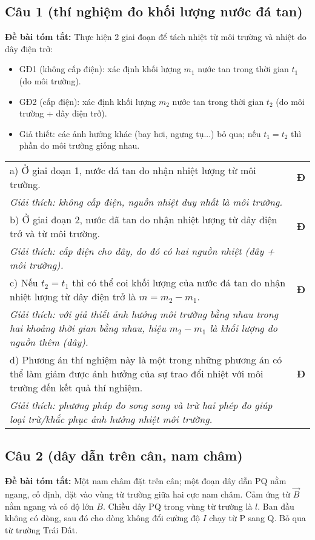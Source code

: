 \documentclass[12pt,a4paper]{article}
\begin{document}
\subsection*{Câu 1 (thí nghiệm đo khối lượng nước đá tan)}
\textbf{Đề bài tóm tắt:} Thực hiện 2 giai đoạn để tách nhiệt từ môi trường và nhiệt do dây điện trở: 
\begin{itemize}
  \item GĐ1 (không cấp điện): xác định khối lượng $m_1$ nước tan trong thời gian $t_1$ (do môi trường). 
  \item GĐ2 (cấp điện): xác định khối lượng $m_2$ nước tan trong thời gian $t_2$ (do môi trường + dây điện trở). 
  \item Giả thiết: các ảnh hưởng khác (bay hơi, ngưng tụ...) bỏ qua; nếu $t_1=t_2$ thì phần do môi trường giống nhau.
\end{itemize}

\begin{tabular}{p{}l}
a) Ở giai đoạn 1, nước đá tan do nhận nhiệt lượng từ môi trường. & \textbf{Đ} \\
\quad\textit{Giải thích: không cấp điện, nguồn nhiệt duy nhất là môi trường.} & \\[4pt]
b) Ở giai đoạn 2, nước đã tan do nhận nhiệt lượng từ dây điện trở và từ môi trường. & \textbf{Đ} \\
\quad\textit{Giải thích: cấp điện cho dây, do đó có hai nguồn nhiệt (dây + môi trường).} & \\[4pt]
c) Nếu $t_2=t_1$ thì có thể coi khối lượng của nước đá tan do nhận nhiệt lượng từ dây điện trở là $m=m_2-m_1$. & \textbf{Đ} \\
\quad\textit{Giải thích: với giả thiết ảnh hưởng môi trường bằng nhau trong hai khoảng thời gian bằng nhau, hiệu $m_2-m_1$ là khối lượng do nguồn thêm (dây).} & \\[4pt]
d) Phương án thí nghiệm này là một trong những phương án có thể làm giảm được ảnh hưởng của sự trao đổi nhiệt với môi trường đến kết quả thí nghiệm. & \textbf{Đ} \\
\quad\textit{Giải thích: phương pháp đo song song và trừ hai phép đo giúp loại trừ/khắc phục ảnh hưởng nhiệt môi trường.} & \\
\end{tabular}

\bigskip
\subsection*{Câu 2 (dây dẫn trên cân, nam châm)}
\textbf{Đề bài tóm tắt:} Một nam châm đặt trên cân; một đoạn dây dẫn PQ nằm ngang, cố định, đặt vào vùng từ trường giữa hai cực nam châm. Cảm ứng từ $\vec B$ nằm ngang và có độ lớn $B$. Chiều dây PQ trong vùng từ trường là $l$. Ban đầu không có dòng, sau đó cho dòng không đổi cường độ $I$ chạy từ P sang Q. Bỏ qua từ trường Trái Đất.
\end{document}
